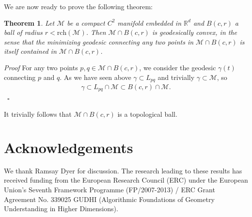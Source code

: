 \documentclass{article}
\newenvironment{proof}[1][{}]{%
  \begin{trivlist}\item[]\textit{Proof #1}\quad}%
  {\hfill\hspace*{\fill}~$\square$\end{trivlist}}
\newtheorem{theorem}{Theorem}[section]
\newcommand{\M}{\mathcal{M}}
\newcommand{\rch}{\mathrm{rch}}
\begin{document}
We are now ready to prove the following theorem:
\begin{theorem}
Let $\M$ be a compact $C^2$ manifold embedded in $\mathbb{R}^d$ and $B(c,r)$ a ball of radius $r<\rch(\M)$. Then $\M \cap B(c,r)$ is geodesically convex, in the sense that the minimizing geodesic connecting any two points in $\M \cap B(c,r)$ is itself contained in $\M \cap B(c,r)$. 
\end{theorem}
\begin{proof}
For any two points $p,q \in \M \cap B(c,r)$, we consider the geodesic $\gamma(t)$ connecting $p$ and $q$. As we have seen above $\gamma \subset L_{pq}$ and trivially $\gamma \subset \M$, so 
\begin{align}
\gamma \subset  L_{pq} \cap \M \subset B(c,r) \cap \M.
\nonumber
\end{align} 
\end{proof}

It trivially follows that $\M \cap B(c,r)$ is a topological ball. 

\section*{Acknowledgements} 
We thank Ramsay Dyer for discussion. The research leading to these results has received funding from the European Research Council (ERC) under  the  European  Union's  Seventh  Framework  Programme (FP/2007-2013)  /  ERC  Grant Agreement No. 339025 GUDHI (Algorithmic Foundations of Geometry Understanding in Higher Dimensions).

%

\end{document}
